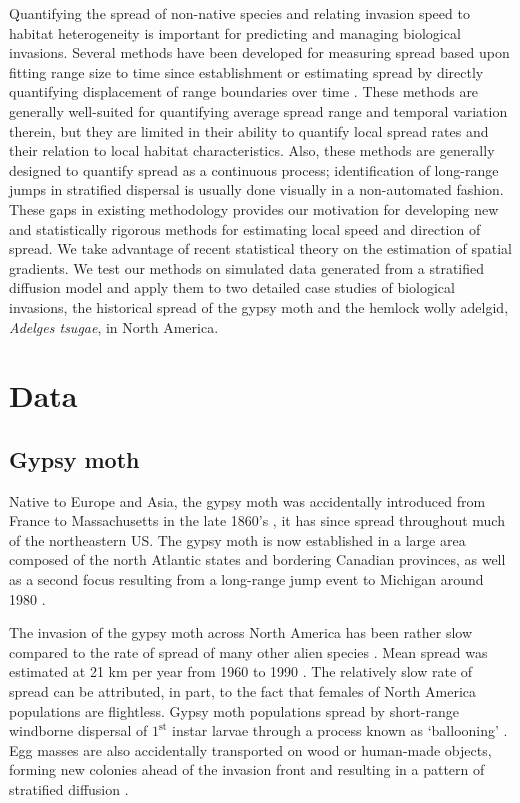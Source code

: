 \documentclass[12pt]{article}
\begin{document}
Quantifying the spread of non-native species and relating invasion speed to habitat heterogeneity is important for predicting and managing biological invasions. Several methods have been developed for measuring spread based upon fitting range size to time since establishment or estimating spread by directly quantifying displacement of range boundaries over time \citep{sharov1997methods,tobin2007comparison,gilbert2010comparing}.  These methods are generally well-suited for quantifying average spread range and temporal variation therein, but they are limited in their ability to quantify local spread rates and their relation to local habitat characteristics.  Also, these methods are generally designed to quantify spread as a continuous process; identification of long-range jumps in stratified dispersal is usually done visually in a non-automated fashion. These gaps in existing methodology provides our motivation for developing new and statistically rigorous methods for estimating local speed and direction of spread. We take advantage of recent statistical theory on the estimation of spatial gradients. We test our methods on simulated data generated from a stratified diffusion model and apply them to two detailed case studies of biological invasions, the historical spread of the gypsy moth and the hemlock wolly adelgid, {\it Adelges tsugae}, in North America.


\section{Data} \label{sec:data}

\subsection{Gypsy moth}

Native to Europe and Asia, the gypsy moth was accidentally introduced from France to Massachusetts in the late 1860's \citep{liebhold1989learning}, it has since spread throughout much of the northeastern US. The gypsy moth is now established in a large area composed of the north Atlantic states and bordering Canadian provinces, as well as a second focus resulting from a long-range jump event to Michigan around 1980 \citep{liebhold1992gypsy,johnson2006allee,tobin2007invasion}.

The invasion of the gypsy moth across North America has been rather slow compared to the rate of spread of many other alien species \citep{liebhold2008population}. Mean spread was estimated at 21 km per year from 1960 to 1990 \citep{liebhold1992gypsy}. The relatively slow rate of spread can be attributed, in part, to the fact that females of North America populations are flightless. Gypsy moth populations spread by short-range windborne dispersal of $1^{\text{st}}$ instar larvae through a process known as `ballooning' \citep{mason1981larval}. Egg masses are also accidentally transported on wood or human-made objects, forming new colonies ahead of the invasion front and resulting in a pattern of stratified diffusion \citep{sharov2002slow}.
\end{document}
